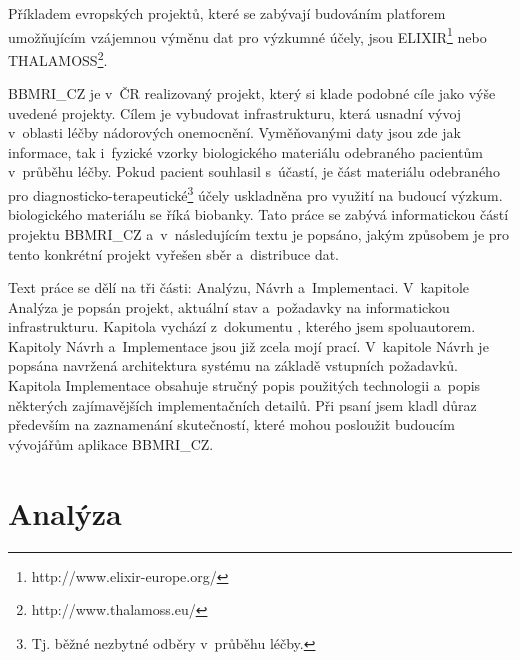 \documentclass[11pt, draft, oneside]{fithesis2}
\newcommand{\ProjectName}{\mbox{BBMRI\_CZ}\xspace}
\begin{document}
Příkladem evropských projektů, které se zabývají budováním platforem umožňujícím vzájemnou výměnu dat pro výzkumné účely, jsou ELIXIR\footnote{http://www.elixir-europe.org/} nebo THALAMOSS\footnote{http://www.thalamoss.eu/}. 

\ProjectName je v~ČR realizovaný projekt, který si klade podobné cíle jako výše uvedené projekty. Cílem je vybudovat infrastrukturu, která usnadní vývoj v~oblasti léčby nádorových onemocnění. Vyměňovanými daty jsou zde jak informace, tak i~fyzické vzorky biologického materiálu odebraného pacientům v~průběhu léčby. Pokud pacient souhlasil s~účastí, je část materiálu odebraného pro diagnosticko-terapeutické\footnote{Tj. běžné nezbytné odběry v~průběhu léčby.} účely uskladněna pro využití na budoucí výzkum.  biologického materiálu se říká biobanky. 
Tato práce se zabývá informatickou částí projektu \ProjectName a~v~následujícím textu je popsáno, jakým způsobem je pro tento konkrétní projekt vyřešen sběr a~distribuce dat. 

Text práce se dělí na tři části: Analýzu, Návrh a~Implementaci. V~kapitole Analýza je popsán projekt, aktuální stav a~požadavky na informatickou infrastrukturu. Kapitola vychází z~dokumentu \cite{ARCH_2014_1_25}, kterého jsem spoluautorem. Kapitoly Návrh a~Implementace jsou již zcela mojí prací. V~kapitole Návrh je popsána navržená architektura systému na základě vstupních požadavků. Kapitola Implementace obsahuje stručný popis použitých technologii a~popis některých zajímavějších implementačních detailů. Při psaní jsem kladl důraz především na zaznamenání skutečností, které mohou posloužit budoucím vývojářům aplikace \ProjectName.

\chapter{Analýza}\label{chapter:analysis}

\end{document}

